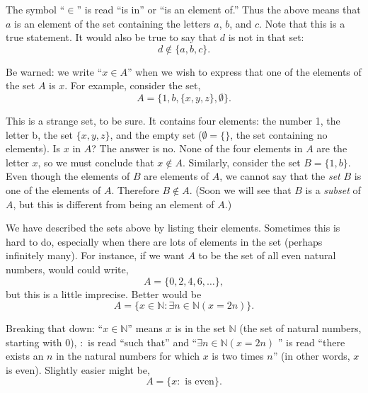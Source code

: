 \documentclass[10pt,]{book}
\theoremstyle{plain}
\theoremstyle{definition}
\theoremstyle{definition}
\theoremstyle{definition}
\numberwithin{equation}{section}
\def\N{\mathbb N}
\def\st{:}
\begin{document}
      The symbol ``\(\in\)'' is read ``is in'' or ``is an element of.'' Thus the above means that \(a\) is an element of the set containing the letters \(a\), \(b\), and \(c\). Note that this is a true statement. It would also be true to say that \(d\) is not in that set:
      \begin{equation*}
        d \not\in \{a, b, c\}.
      \end{equation*}
\par

      Be warned: we write ``\(x \in A\)'' when we wish to express that one of the elements of the set \(A\) is \(x\). For example, consider the set,
      \begin{equation*}
        A = \{1, b, \{x, y, z\}, \emptyset\}.
      \end{equation*}
\par

      This is a strange set, to be sure. It contains four elements: the number 1, the letter b, the set \(\{x,y,z\}\), and the empty set (\(\emptyset = \{ \}\), the set containing no elements). Is \(x\) in \(A\)? The answer is no. None of the four elements in \(A\) are the letter \(x\), so we must conclude that \(x \notin A\). Similarly, consider the set \(B = \{1,b\}\). Even though the elements of \(B\) are elements of \(A\), we cannot say that the \emph{set} \(B\) is one of the elements of \(A\). Therefore \(B \notin A\). (Soon we will see that \(B\) is a \emph{subset} of \(A\), but this is different from being an element of \(A\).)
\par

      We have described the sets above by listing their elements. Sometimes this is hard to do, especially when there are lots of elements in the set (perhaps infinitely many). For instance, if we want \(A\) to be the set of all even natural numbers, would could write,
      \begin{equation*}
        A = \{0, 2, 4, 6, \ldots\},
      \end{equation*}
      but this is a little imprecise. Better would be
      \begin{equation*}
        A = \{x \in \N \st \exists n\in \N ( x = 2 n)\}.
      \end{equation*}
\par

      Breaking that down: ``\(x \in \N\)'' means \(x\) is in the set \(\N\) \label{notation-2}
 (the set of natural numbers, starting with 0), \(:\) \label{notation-3}
 is read ``such that'' and ``\(\exists n\in \N (x = 2n) \)
      '' is read ``there exists an \(n\) in the natural numbers for which \(x\) is two times \(n\)'' (in other words, \(x\) is even). Slightly easier might be,
      \begin{equation*}
        A = \{x \st \mbox{  is even} \}.
      \end{equation*}
\par
\end{document}
